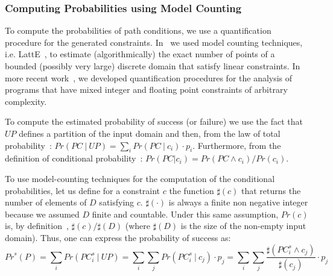 \subsubsection{Computing Probabilities using Model Counting} 
To compute the probabilities of path conditions, we use a
quantification procedure for the generated constraints.
In~\cite{filieri-etal-icse2013} we used model counting techniques,
i.e. LattE~\cite{deLoera-etal-2012}, to estimate (algorithmically) the exact
number of points of a bounded (possibly very large) discrete domain
that satisfy linear constraints.  In more recent work~\cite{Borges2014PLDI},  
we developed quantification procedures for
the analysis of programs that have mixed integer and floating point
constraints of arbitrary complexity.

To compute the estimated probability of
success (or failure)  we use the fact that $UP$
defines a partition of the input domain and then, from the law of total
probability~\cite{pestman2009}:
$\textit{Pr}(\textit{PC} \ | \ \textit{UP}) =  \sum_{i} \textit{Pr}(\textit{PC} \ | \ c_i) \cdot p_i$.
Furthermore, from the definition of conditional probability~\cite{pestman2009}:
$\textit{Pr}(\textit{PC} |c_i) = \textit{Pr}(\textit{PC} \wedge c_i) / \textit{Pr}(c_i)$. 

To use model-counting techniques for the computation of the
conditional probabilities, let us define for a constraint $c$ the
function $\sharp(c)$ that returns the number of elements of $D$
satisfying $c$. $\sharp(\cdot)$ is always a finite non negative
integer because we assumed $D$ finite and countable. Under this same
assumption, $\textit{Pr}(c)$ is, by definition~\cite{pestman2009},
$\sharp(c) / \sharp(D)$ (where $\sharp(D)$ is the size of the non-empty
input domain).  Thus, one can express the probability of success as:
\setlength\abovedisplayskip{-1pt}
\setlength\belowdisplayskip{-2pt}
\begin{equation*}
\textit{Pr}^s(P)=\sum_{i} \textit{Pr}(\textit{PC}_i^s \ | \ \textit{UP})=
 \sum_{i} \sum_{j} \textit{Pr}(\textit{PC}_i^s \ | \ c_j) \cdot p_j= \sum_{i} \sum_{j} \frac{\sharp(\textit{PC}_i^s \land c_j)}{\sharp(c_j)} \cdot p_j
\end{equation*}
